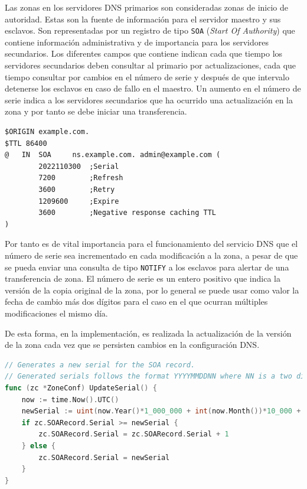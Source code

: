 Las zonas en los servidores DNS primarios son consideradas zonas de inicio de autoridad. Estas son la fuente de información para el servidor maestro y sus esclavos. Son representadas por un registro de tipo \verb|SOA| (\textit{Start Of Authority}) que contiene información administrativa y de importancia para los servidores secundarios. Los diferentes campos que contiene indican cada que tiempo los servidores secundarios deben consultar al primario por actualizaciones, cada que tiempo consultar por cambios en el número de serie y después de que intervalo detenerse los esclavos en caso de fallo en el maestro. Un aumento en el número de serie indica a los servidores secundarios que ha ocurrido una actualización en la zona y por tanto se debe iniciar una transferencia.

\begin{lstlisting}[frame=single, numbers=none, caption=Ejemplo de zona con \textit{SOA}.]
$ORIGIN example.com.
$TTL 86400
@   IN  SOA     ns.example.com. admin@example.com (
        2022110300  ;Serial
        7200        ;Refresh
        3600        ;Retry
        1209600     ;Expire
        3600        ;Negative response caching TTL
)
\end{lstlisting}

Por tanto es de vital importancia para el funcionamiento del servicio DNS que el número de serie sea incrementado en cada modificación a la zona, a pesar de que se pueda enviar una consulta de tipo \verb|NOTIFY| a los esclavos para alertar de una transferencia de zona. El número de serie es un entero positivo que indica la versión de la copia original de la zona, por lo general se puede usar como valor la fecha de cambio más dos dígitos para el caso en el que ocurran múltiples modificaciones el mismo día.

De esta forma, en la implementación, es realizada la actualización de la versión de la zona cada vez que se persisten cambios en la configuración DNS.

\begin{lstlisting}[frame=single, language=Go]
// Generates a new serial for the SOA record.
// Generated serials follows the format YYYYMMDDNN where NN is a two digits identifier.
func (zc *ZoneConf) UpdateSerial() {
    now := time.Now().UTC()
    newSerial := uint(now.Year()*1_000_000 + int(now.Month())*10_000 + now.Day()*100)
    if zc.SOARecord.Serial >= newSerial {
        zc.SOARecord.Serial = zc.SOARecord.Serial + 1
    } else {
        zc.SOARecord.Serial = newSerial
    }
}
\end{lstlisting}

